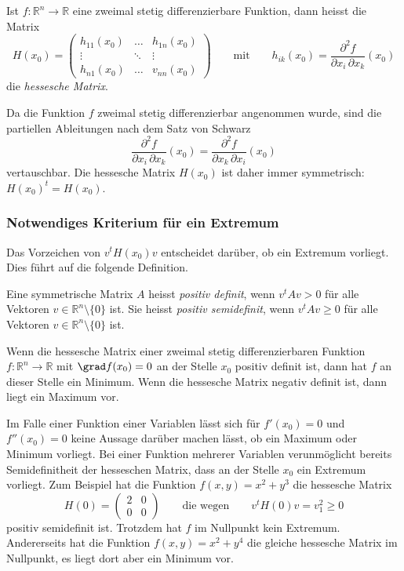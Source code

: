 \begin{definition}
Ist $f\colon\mathbb{R}^n\to\mathbb{R}$ eine zweimal stetig differenzierbare
Funktion, dann heisst die Matrix
\[
H(x_0)
=
\begin{pmatrix}
h_{11}(x_0)&\dots &h_{1n}(x_0)\\
\vdots&\ddots&\vdots\\
h_{n1}(x_0)&\dots &v_{nn}(x_0)
\end{pmatrix}
\qquad\text{mit}\qquad
h_{ik}(x_0)
=
\frac{\partial^2 f}{\partial x_i\,\partial x_k}(x_0)
\]
die {\em hessesche Matrix}.
\end{definition}

Da die Funktion $f$ zweimal stetig differenzierbar angenommen wurde,
sind die partiellen Ableitungen nach dem Satz von Schwarz
\[
\frac{\partial^2 f}{\partial x_i\,\partial x_k}(x_0)
=
\frac{\partial^2 f}{\partial x_k\,\partial x_i}(x_0)
\]
vertauschbar.
Die hessesche Matrix $H(x_0)$ ist daher immer symmetrisch: $H(x_0)^t=H(x_0)$.

%
%
\subsubsection{Notwendiges Kriterium für ein Extremum}
Das Vorzeichen von $v^tH(x_0)v$ entscheidet darüber, ob ein Extremum
vorliegt.
Dies führt auf die folgende Definition.

\begin{definition}
Eine symmetrische Matrix $A$ heisst {\em positiv definit}, wenn 
%
%
$v^tAv>0$ für alle Vektoren $v\in\mathbb{R}^n\setminus\{0\}$ ist.
Sie heisst {\em positiv semidefinit}, wenn $v^tAv\ge 0$ für alle
Vektoren
%
%
$v\in\mathbb{R}^n\setminus\{0\}$ ist.
\end{definition}

\begin{satz}
\label{buch:fuvar:hessesche:satz:kriterium}
Wenn die hessesche Matrix einer zweimal stetig differenzierbaren
Funktion $f\colon\mathbb{R}^n\to\mathbb{R}$ mit $\grad f(x_0)=0$ 
an der Stelle $x_0$ positiv definit ist, dann hat $f$ an dieser
Stelle ein Minimum.
Wenn die hessesche Matrix negativ definit ist, dann liegt ein Maximum
vor.
\end{satz}

Im Falle einer Funktion einer Variablen lässt sich für $f'(x_0)=0$
und $f''(x_0)=0$ keine Aussage darüber machen lässt, ob ein Maximum 
oder Minimum vorliegt.
Bei einer Funktion mehrerer Variablen verunmöglicht bereits Semidefinitheit
der hesseschen Matrix, dass an der Stelle $x_0$ ein Extremum vorliegt.
Zum Beispiel hat die Funktion $f(x,y)=x^2+y^3$ die hessesche Matrix
\[
H(0)
=
\begin{pmatrix}
2&0\\
0&0
\end{pmatrix}
\qquad\text{die wegen}\qquad
v^tH(0)v = v_1^2 \ge 0
\]
positiv semidefinit ist.
Trotzdem hat $f$ im Nullpunkt kein Extremum.
Andererseits hat die Funktion $f(x,y)=x^2+y^4$ die gleiche hessesche
Matrix im Nullpunkt, es liegt dort aber ein Minimum vor.

